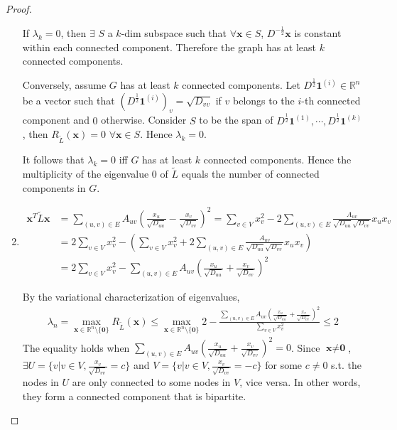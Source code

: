 \documentclass[a4paper]{article}
\theoremstyle{definition}
\begin{document}
\begin{proof}
\begin{enumerate}
    If $\lambda_k=0$, then $\exists$ $S$ a $k$-dim subspace such that $\forall \textbf{x}\in S$, $D^{-\frac{1}{2}}\textbf{x}$ is constant within each connected component. Therefore the graph has at least $k$ connected components. 
    
    Conversely, assume $G$ has at least $k$ connected components. Let $D^{\frac{1}{2}}\textbf{1}^{(i)}\in\mathbb{R}^{n}$ be a vector such that $(D^{\frac{1}{2}}\textbf{1}^{(i)})_v=\sqrt{D_{vv}}$ if $v$ belongs to the $i$-th connected component and $0$ otherwise. Consider $S$ to be the span of $D^{\frac{1}{2}}\textbf{1}^{(1)},\cdots, D^{\frac{1}{2}}\textbf{1}^{(k)}$, then $R_{\tilde{L}}(\textbf{x})=0$ $\forall \textbf{x}\in S$. Hence $\lambda_k=0$.
    
    It follows that $\lambda_k=0$ iff $G$ has at least $k$ connected components. Hence the multiplicity of the eigenvalue $0$ of $\tilde{L}$ equals the number of connected components in $G$.
    
    \item \begin{align}\textbf{x}^{T}\tilde{L}\textbf{x} &= \sum_{(u, v)\in E}A_{uv}\left(\frac{x_u}{\sqrt{D_{uu}}}-\frac{x_v}{\sqrt{D_{vv}}}\right)^2 = \sum_{v\in V}x_v^2-2\sum_{(u, v)\in E}\frac{A_{uv}}{\sqrt{D_{uu}}\sqrt{D_{vv}}}x_u x_v\\
    &=2\sum_{v\in V}x_v^2-\left(\sum_{v\in V}x_v^2+2\sum_{(u, v)\in E}\frac{A_{uv}}{\sqrt{D_{uu}}\sqrt{D_{vv}}}x_u x_v\right)\\
    &= 2\sum_{v\in V}x_v^2-\sum_{(u, v)\in E}A_{uv}\left(\frac{x_u}{\sqrt{D_{uu}}}+\frac{x_v}{\sqrt{D_{vv}}}\right)^2\end{align}
    
    By the variational characterization of eigenvalues, 
    \begin{align}
    \lambda_n = \max_{\textbf{x}\in\mathbb{R}^{n}\setminus\{\textbf{0}\}}R_{\tilde{L}}(\textbf{x}) \leq \max_{\textbf{x}\in\mathbb{R}^{n}\setminus\{\textbf{0}\}} 2 - \frac{\sum_{(u, v)\in E}A_{uv}\left(\frac{x_u}{\sqrt{D_{uu}}}+\frac{x_v}{\sqrt{D_{vv}}}\right)^2}{\sum_{v\in V}x_v^2}\leq 2
    \end{align} The equality holds when $\sum_{(u, v)\in E}A_{uv}\left(\frac{x_u}{\sqrt{D_{uu}}}+\frac{x_v}{\sqrt{D_{vv}}}\right)^2=0$. Since $\textbf{x}\neq\textbf{0}$, $\exists U=\{v|v\in V, \frac{x_v}{\sqrt{D_{vv}}}=c\}$ and $V=\{v|v\in V, \frac{x_v}{\sqrt{D_{vv}}}=-c\}$ for some $c\neq 0$ s.t. the nodes in $U$ are only connected to some nodes in $V$, vice versa. In other words, they form a connected component that is bipartite.
\end{enumerate}
\end{proof}
\end{document}

